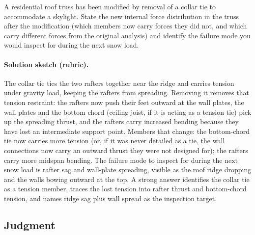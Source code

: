 \begin{exercise}
A residential roof truss has been modified by removal of a
collar tie to accommodate a skylight. State the new internal force
distribution in the truss after the modification (which members now
carry forces they did not, and which carry different forces from the
original analysis) and identify the failure mode you would inspect
for during the next snow load.

\paragraph{Solution sketch (rubric).} The collar tie ties the two
rafters together near the ridge and carries tension under gravity load,
keeping the rafters from spreading. Removing it removes that tension
restraint: the rafters now push their feet outward at the wall plates,
the wall plates and the bottom chord (ceiling joist, if it is acting as
a tension tie) pick up the spreading thrust, and the rafters carry
increased bending because they have lost an intermediate support point.
Members that change: the bottom-chord tie now carries more tension (or,
if it was never detailed as a tie, the wall connections now carry an
outward thrust they were not designed for); the rafters carry more
midspan bending. The failure mode to inspect for during the next snow
load is rafter sag and wall-plate spreading, visible as the roof
ridge dropping and the walls bowing outward at the top. A strong answer
identifies the collar tie as a tension member, traces the lost tension
into rafter thrust and bottom-chord tension, and names ridge sag plus
wall spread as the inspection target.
\end{exercise}

\subsection*{Judgment}

